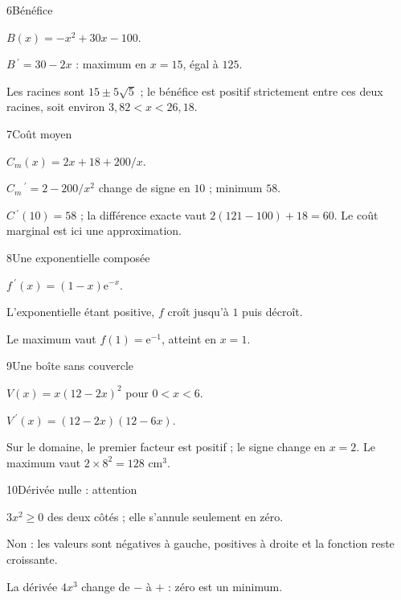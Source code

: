 \begin{corrige}{6}{Bénéfice}
\begin{questions}
\item $B(x)=-x^2+30x-100$.
\item $B\,\!^{\prime}=30-2x$ : maximum en $x=15$, égal à $125$.
\item Les racines sont $15\pm5\sqrt5$ ; le bénéfice est positif strictement entre ces deux racines, soit environ $3{,}82<x<26{,}18$.
\end{questions}
\end{corrige}
\begin{corrige}{7}{Coût moyen}
\begin{questions}
\item $C_m(x)=2x+18+200/x$.
\item $C_m\,\!^{\prime}=2-200/x^2$ change de signe en $10$ ; minimum $58$.
\item $C\,\!^{\prime}(10)=58$ ; la différence exacte vaut $2(121-100)+18=60$. Le coût marginal est ici une approximation.
\end{questions}
\end{corrige}
\begin{corrige}{8}{Une exponentielle composée}
\begin{questions}
\item $f\,\!^{\prime}(x)=(1-x)\mathrm e^{-x}$.
\item L’exponentielle étant positive, $f$ croît jusqu’à $1$ puis décroît.
\item Le maximum vaut $f(1)=\mathrm e^{-1}$, atteint en $x=1$.
\end{questions}
\end{corrige}
\begin{corrige}{9}{Une boîte sans couvercle}
\begin{questions}
\item $V(x)=x(12-2x)^2$ pour $0<x<6$.
\item $V\,\!^{\prime}(x)=(12-2x)(12-6x)$.
\item Sur le domaine, le premier facteur est positif ; le signe change en $x=2$. Le maximum vaut $2\times8^2=128$ cm$^3$.
\end{questions}
\end{corrige}
\begin{corrige}{10}{Dérivée nulle : attention}
\begin{questions}
\item $3x^2\geq0$ des deux côtés ; elle s’annule seulement en zéro.
\item Non : les valeurs sont négatives à gauche, positives à droite et la fonction reste croissante.
\item La dérivée $4x^3$ change de $-$ à $+$ : zéro est un minimum.
\end{questions}
\end{corrige}
